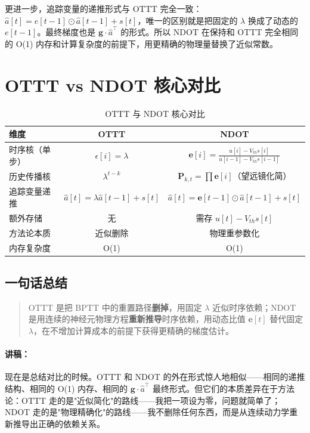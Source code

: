 \documentclass[journal,12pt,onecolumn]{IEEEtran}
\begin{document}
更进一步，追踪变量的递推形式与 OTTT 完全一致：$\hat{a}[t] = e[t-1] \odot \hat{a}[t-1] + s[t]$，唯一的区别就是把固定的 $\lambda$ 换成了动态的 $e[t-1]$。最终梯度也是 $\mathbf{g} \cdot \hat{a}^\top$ 的形式。所以 NDOT 在保持和 OTTT 完全相同的 O(1) 内存和计算复杂度的前提下，用更精确的物理量替换了近似常数。

\section{OTTT vs NDOT 核心对比}

\begin{table}[h]
\centering
\caption{OTTT 与 NDOT 核心对比}
\begin{tabular}{lcc}
\toprule
\textbf{维度} & \textbf{OTTT} & \textbf{NDOT} \\
\midrule
时序核（单步）  & $\epsilon[i] = \lambda$ & $\mathbf{e}[i] = \frac{u[i]-V_{th}s[i]}{u[i-1]-V_{th}s[i-1]}$ \\
历史传播核    & $\lambda^{t-k}$ & $\mathbf{P}_{k,t} = \prod \mathbf{e}[i]$（望远镜化简） \\
追踪变量递推  & $\hat{a}[t] = \lambda\hat{a}[t-1] + s[t]$ & $\hat{a}[t] = \mathbf{e}[t-1]\odot\hat{a}[t-1] + s[t]$ \\
额外存储      & 无 & 需存 $u[t]-V_{th}s[t]$ \\
方法论本质    & 近似删除 & 物理重参数化 \\
内存复杂度    & O(1) & O(1) \\
\bottomrule
\end{tabular}
\label{tab.ottt_ndot}
\end{table}

\subsection*{一句话总结}

\begin{quote}
OTTT 是把 BPTT 中的重置路径\textbf{删掉}，用固定 $\lambda$ 近似时序依赖；NDOT 是用连续的神经元物理方程\textbf{重新推导}时序依赖，用动态比值 $\mathbf{e}[t]$ 替代固定 $\lambda$，在不增加计算成本的前提下获得更精确的梯度估计。
\end{quote}

\paragraph{讲稿：}
现在是总结对比的时候。OTTT 和 NDOT 的外在形式惊人地相似——相同的递推结构、相同的 O(1) 内存、相同的 $\mathbf{g}\cdot\hat{a}^\top$ 最终形式。但它们的本质差异在于方法论：OTTT 走的是"近似简化"的路线——我把一项设为零，问题就简单了；NDOT 走的是"物理精确化"的路线——我不删除任何东西，而是从连续动力学重新推导出正确的依赖关系。
\end{document}
